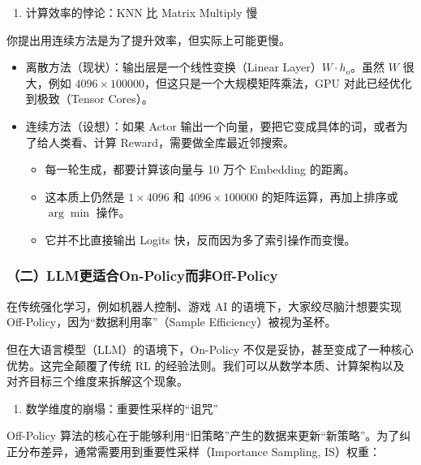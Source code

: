 \begin{enumerate}
\def\labelenumi{\arabic{enumi}.}
\setcounter{enumi}{2}
\tightlist
\item
  计算效率的悖论：KNN 比 Matrix Multiply 慢
\end{enumerate}

你提出用连续方法是为了提升效率，但实际上可能更慢。

\begin{itemize}
\tightlist
\item
  离散方法（现状）：输出层是一个线性变换（Linear Layer）\(W\cdot h_o\)。虽然 \(W\) 很大，例如 \(4096\times100000\)，但这只是一个大规模矩阵乘法，GPU 对此已经优化到极致（Tensor Cores）。
\item
  连续方法（设想）：如果 Actor 输出一个向量，要把它变成具体的词，或者为了给人类看、计算 Reward，需要做全库最近邻搜索。

  \begin{itemize}
  \tightlist
  \item
    每一轮生成，都要计算该向量与 10 万个 Embedding 的距离。
  \item
    这本质上仍然是 \(1\times4096\) 和 \(4096\times100000\) 的矩阵运算，再加上排序或 \(\arg\min\) 操作。
  \item
    它并不比直接输出 Logits 快，反而因为多了索引操作而变慢。
  \end{itemize}
\end{itemize}

\hypertarget{ux4e8cllmux66f4ux9002ux5408on-policyux800cux975eoff-policy}{%
\subsubsection{（二）LLM更适合On-Policy而非Off-Policy}\label{ux4e8cllmux66f4ux9002ux5408on-policyux800cux975eoff-policy}}

在传统强化学习，例如机器人控制、游戏 AI 的语境下，大家绞尽脑汁想要实现 Off-Policy，因为``数据利用率''（Sample Efficiency）被视为圣杯。

但在大语言模型（LLM）的语境下，On-Policy 不仅是妥协，甚至变成了一种核心优势。这完全颠覆了传统 RL 的经验法则。我们可以从数学本质、计算架构以及对齐目标三个维度来拆解这个现象。

\begin{enumerate}
\def\labelenumi{\arabic{enumi}.}
\tightlist
\item
  数学维度的崩塌：重要性采样的``诅咒''
\end{enumerate}

Off-Policy 算法的核心在于能够利用``旧策略''产生的数据来更新``新策略''。为了纠正分布差异，通常需要用到重要性采样（Importance Sampling, IS）权重：

